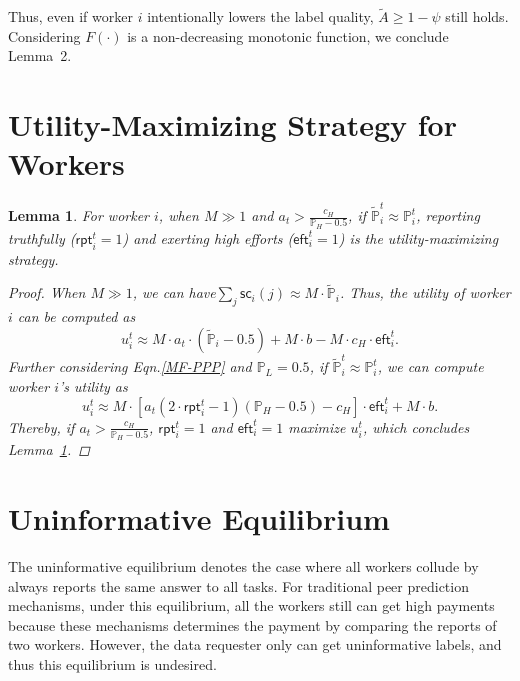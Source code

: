 \documentclass{article}
\newtheorem{lemma}[theorem]{Lemma}
\begin{document}
Thus, even if worker $i$ intentionally lowers the label quality, $\tilde{A}\geq 1-\psi$ still holds.
Considering $F(\cdot)$ is a non-decreasing monotonic function, we conclude Lemma~2.

\section{Utility-Maximizing Strategy for Workers}
\begin{lemma}
\label{Strategy}
For worker $i$, when $M\gg 1$ and $a_t>\frac{c_H}{\mathbb{P}_H-0.5}$, if $\tilde{\mathbb{P}}^t_i\approx \mathbb{P}^t_i$, reporting truthfully ($\textsf{rpt}^{t}_i=1$) and exerting high efforts ($\textsf{eft}^{t}_i=1$) is the utility-maximizing strategy.
\begin{proof}
When $M\gg 1$, we can have$\sum_j \textsf{sc}_i(j)\approx M\cdot \tilde{\mathbb{P}}_i$. Thus, the utility of worker $i$ can be computed as
\begin{equation}
u_i^t\approx  M\cdot a_t\cdot (\tilde{\mathbb{P}}_i-0.5) + M\cdot b- M \cdot c_H\cdot \textsf{eft}^{t}_i.
\end{equation}
Further considering Eqn.\ref{MF-PPP} and $\mathbb{P}_L=0.5$, if $\tilde{\mathbb{P}}^t_i\approx \mathbb{P}^t_i$, we can compute worker $i$'s utility as
\begin{equation}
u_i^t\approx M\cdot [a_t(2\cdot \textsf{rpt}^{t}_i-1)(\mathbb{P}_H-0.5)-c_H]\cdot\textsf{eft}^{t}_i+ M\cdot b.
\end{equation}
Thereby, if $a_t>\frac{c_H}{\mathbb{P}_H-0.5}$, $\textsf{rpt}^{t}_i=1$ and $\textsf{eft}^{t}_i=1$ maximize $u_i^t$, which concludes Lemma~\ref{Strategy}.
\end{proof}
\end{lemma}

\section{Uninformative Equilibrium}
The uninformative equilibrium denotes the case where all workers collude by always reports the same answer to all tasks.
For traditional peer prediction mechanisms, under this equilibrium, all the workers still can get high payments because these mechanisms determines the payment by comparing the reports of two workers.
However, the data requester only can get uninformative labels, and thus this equilibrium is undesired.
\end{document}
